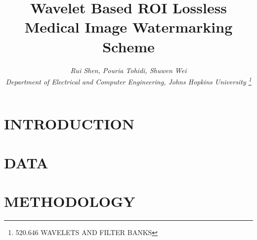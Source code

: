 \documentclass[letterpaper, 10 pt, conference]{ieeeconf}  %
\title{\LARGE \bf {Wavelet Based ROI Lossless Medical Image Watermarking Scheme}}
\author{\it Rui Shen, Pouria Tohidi, Shuwen Wei  \\ %
\normalsize {Department of Electrical and Computer Engineering, Johns Hopkins University}
\thanks{520.646 WAVELETS AND FILTER BANKS}}
\begin{document}
\maketitle
\thispagestyle{empty}
\pagestyle{empty}


\begin{abstract}


\end{abstract}


\section{INTRODUCTION}


\section{DATA}


\section{METHODOLOGY}
\end{document}

